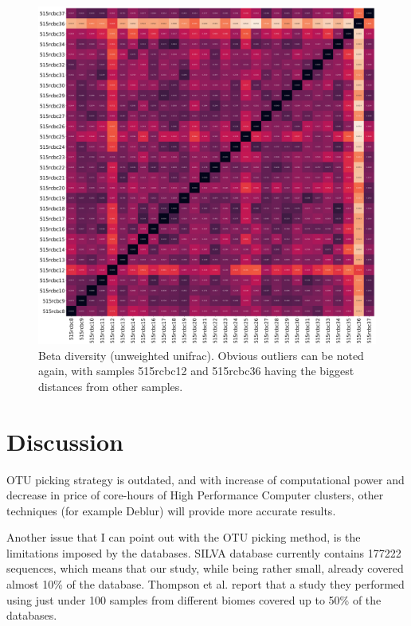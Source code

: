 \documentclass{article}
\begin{document}
\begin{multicols}{2}
\begin{figure}[H]
	\includegraphics[width=\linewidth]{../analyses/figs/unweighted_beta.png}
	\caption{Beta diversity (unweighted unifrac). Obvious outliers can be noted again, with samples 515rcbc12 and 515rcbc36 having the biggest distances from other samples.}
	\label{fig:beta_diversity}
\end{figure}

\section{Discussion}
OTU picking strategy is outdated, and with increase of computational power and decrease in price of core-hours of High Performance Computer clusters, other techniques (for example Deblur\cite{Amir}) will provide more accurate results.
\par

Another issue that I can point out with the OTU picking method, is the limitations imposed by the databases. SILVA database currently contains 177222 sequences, which means that our study, while being rather small, already covered almost 10\% of the database. Thompson et al.\cite{Thompson2017} report that a study they performed using just under 100 samples from different biomes covered up to 50\% of the databases.

\newpage


\end{multicols}
\end{document}
